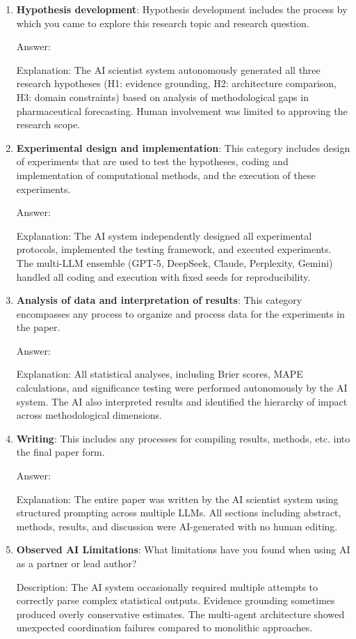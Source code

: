 \documentclass{article}
\begin{document}
\begin{enumerate}
    \item \textbf{Hypothesis development}: Hypothesis development includes the process by which you came to explore this research topic and research question.
    
    Answer: \involvementD{} 
    
    Explanation: The AI scientist system autonomously generated all three research hypotheses (H1: evidence grounding, H2: architecture comparison, H3: domain constraints) based on analysis of methodological gaps in pharmaceutical forecasting. Human involvement was limited to approving the research scope.
    
    \item \textbf{Experimental design and implementation}: This category includes design of experiments that are used to test the hypotheses, coding and implementation of computational methods, and the execution of these experiments.
    
    Answer: \involvementD{}
    
    Explanation: The AI system independently designed all experimental protocols, implemented the testing framework, and executed experiments. The multi-LLM ensemble (GPT-5, DeepSeek, Claude, Perplexity, Gemini) handled all coding and execution with fixed seeds for reproducibility.
    
    \item \textbf{Analysis of data and interpretation of results}: This category encompasses any process to organize and process data for the experiments in the paper.
    
    Answer: \involvementD{}
    
    Explanation: All statistical analyses, including Brier scores, MAPE calculations, and significance testing were performed autonomously by the AI system. The AI also interpreted results and identified the hierarchy of impact across methodological dimensions.
    
    \item \textbf{Writing}: This includes any processes for compiling results, methods, etc. into the final paper form.
    
    Answer: \involvementD{}
    
    Explanation: The entire paper was written by the AI scientist system using structured prompting across multiple LLMs. All sections including abstract, methods, results, and discussion were AI-generated with no human editing.
    
    \item \textbf{Observed AI Limitations}: What limitations have you found when using AI as a partner or lead author?
    
    Description: The AI system occasionally required multiple attempts to correctly parse complex statistical outputs. Evidence grounding sometimes produced overly conservative estimates. The multi-agent architecture showed unexpected coordination failures compared to monolithic approaches.
\end{enumerate}
\end{document}
